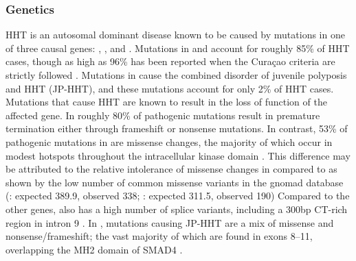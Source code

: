 \subsubsection{Genetics}
HHT is an autosomal dominant disease known to be caused by mutations in one of three causal genes:  \citep{mcallister1994},  \citep{johnson1996}, and  \citep{gallione2004}. Mutations in  and  account for roughly 85\% of HHT cases, though as high as 96\% has been reported when the Cura\c{c}ao criteria are strictly followed \citep{mcdonald2020}. Mutations in  cause the combined disorder of juvenile polyposis and HHT (JP-HHT), and these mutations account for only 2\% of HHT cases. Mutations that cause HHT are known to result in the loss of function of the affected gene. In  roughly 80\% of pathogenic mutations result in premature termination either through frameshift or nonsense mutations. In contrast, 53\% of pathogenic mutations in  are missense changes, the majority of which occur in modest hotspots throughout the intracellular kinase domain \citep{abdalla2003}. This difference may be attributed to the relative intolerance of missense changes in  compared to  as shown by the low number of common missense variants in the gnomad database (: expected 389.9, observed 338; : expected 311.5, observed 190) Compared to the other genes,  also has a high number of splice variants, including a 300bp CT-rich region in intron 9 \citep{wooderchakdonahue2018}. In , mutations causing JP-HHT are a mix of missense and nonsense/frameshift; the vast majority of which are found in exons 8--11, overlapping the MH2 domain of SMAD4 \citep{gallione2004}.

